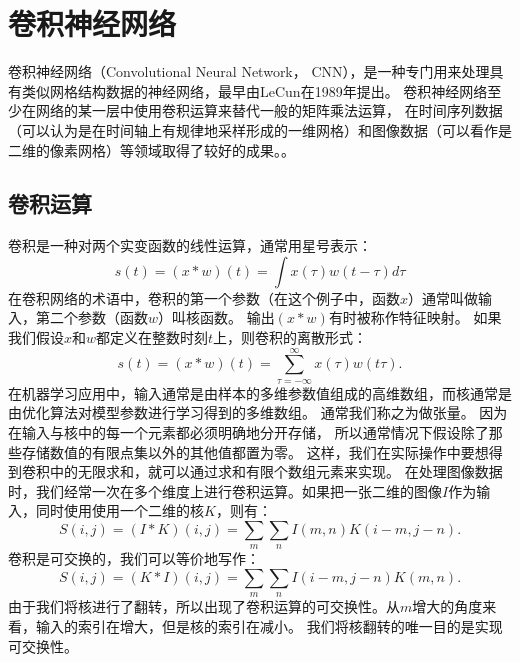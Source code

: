\section{卷积神经网络}
卷积神经网络（Convolutional Neural Network， CNN），是一种专门用来处理具有类似网格结构数据的神经网络，最早由LeCun在1989年提出\cite{lecun1989backpropagation}。
卷积神经网络至少在网络的某一层中使用卷积运算来替代一般的矩阵乘法运算，
在时间序列数据（可以认为是在时间轴上有规律地采样形成的一维网格）和图像数据（可以看作是二维的像素网格）等领域取得了较好的成果。。\par

\subsection{卷积运算}
\label{sec:the_convolution_operation}
卷积是一种对两个实变函数的线性运算，通常用星号表示：
\begin{equation}
s(t) = (x*w)(t) = \int x(\tau)w(t-\tau)d\tau
\end{equation}
在卷积网络的术语中，卷积的第一个参数（在这个例子中，函数$x$）通常叫做输入，第二个参数（函数$w$）叫核函数。
输出$ (x*w)$有时被称作特征映射。
如果我们假设$x$和$w$都定义在整数时刻$t$上，则卷积的离散形式：
\begin{equation}
s(t) = (x*w)(t) = \sum_{\tau = -\infty}^{\infty} x(\tau)w(t\tau).
\end{equation}
在机器学习应用中，输入通常是由样本的多维参数值组成的高维数组，而核通常是由优化算法对模型参数进行学习得到的多维数组。
通常我们称之为做张量。
因为在输入与核中的每一个元素都必须明确地分开存储，
所以通常情况下假设除了那些存储数值的有限点集以外的其他值都置为零。
这样，我们在实际操作中要想得到卷积中的无限求和，就可以通过求和有限个数组元素来实现。
在处理图像数据时，我们经常一次在多个维度上进行卷积运算。如果把一张二维的图像$I$作为输入，同时使用使用一个二维的核$K$，则有：
\begin{equation}
S(i,j) = (I*K)(i,j) = \sum_m \sum_n I(m,n) K(i-m, j-n).
\end{equation}
卷积是可交换的，我们可以等价地写作：
\begin{equation}
S(i, j) = (K*I)(i,j) = \sum_m \sum_n I(i-m, j-n) K(m, n).
\end{equation}
由于我们将核进行了翻转，所以出现了卷积运算的可交换性。从$m$增大的角度来看，输入的索引在增大，但是核的索引在减小。
我们将核翻转的唯一目的是实现可交换性。\par

